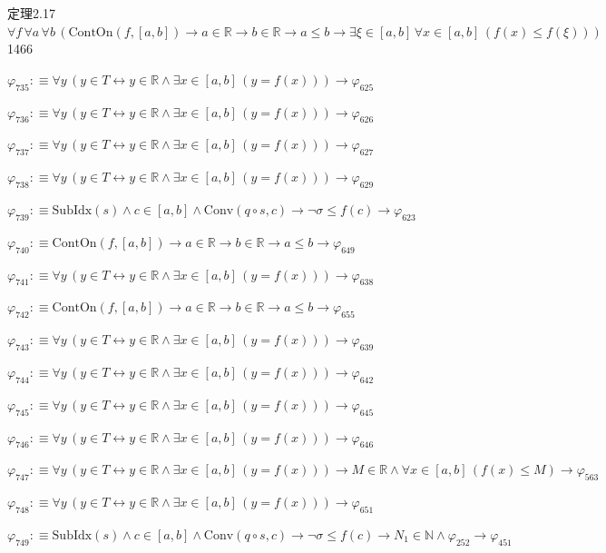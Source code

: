 \begin{fullproof}{定理2.17}{$\forall f\,\forall a\,\forall b\,(\mathrm{ContOn}(f,[a,b]) \to a \in \mathbb{R} \to b \in \mathbb{R} \to a \leq b \to \exists \xi \in [a,b]\,\forall x \in [a,b]\,(f(x) \leq f(\xi)))$}{1466}
\begin{abbrevlist}
\item $\varphi_{735} :\equiv \forall y\,(y \in T \leftrightarrow y \in \mathbb{R} \land \exists x \in [a,b]\,(y = f(x))) \to \varphi_{625}$
\item $\varphi_{736} :\equiv \forall y\,(y \in T \leftrightarrow y \in \mathbb{R} \land \exists x \in [a,b]\,(y = f(x))) \to \varphi_{626}$
\item $\varphi_{737} :\equiv \forall y\,(y \in T \leftrightarrow y \in \mathbb{R} \land \exists x \in [a,b]\,(y = f(x))) \to \varphi_{627}$
\item $\varphi_{738} :\equiv \forall y\,(y \in T \leftrightarrow y \in \mathbb{R} \land \exists x \in [a,b]\,(y = f(x))) \to \varphi_{629}$
\item $\varphi_{739} :\equiv \mathrm{SubIdx}(s) \land c \in [a,b] \land \mathrm{Conv}(q \circ s,c) \to \neg \sigma \leq f(c) \to \varphi_{623}$
\item $\varphi_{740} :\equiv \mathrm{ContOn}(f,[a,b]) \to a \in \mathbb{R} \to b \in \mathbb{R} \to a \leq b \to \varphi_{649}$
\item $\varphi_{741} :\equiv \forall y\,(y \in T \leftrightarrow y \in \mathbb{R} \land \exists x \in [a,b]\,(y = f(x))) \to \varphi_{638}$
\item $\varphi_{742} :\equiv \mathrm{ContOn}(f,[a,b]) \to a \in \mathbb{R} \to b \in \mathbb{R} \to a \leq b \to \varphi_{655}$
\item $\varphi_{743} :\equiv \forall y\,(y \in T \leftrightarrow y \in \mathbb{R} \land \exists x \in [a,b]\,(y = f(x))) \to \varphi_{639}$
\item $\varphi_{744} :\equiv \forall y\,(y \in T \leftrightarrow y \in \mathbb{R} \land \exists x \in [a,b]\,(y = f(x))) \to \varphi_{642}$
\item $\varphi_{745} :\equiv \forall y\,(y \in T \leftrightarrow y \in \mathbb{R} \land \exists x \in [a,b]\,(y = f(x))) \to \varphi_{645}$
\item $\varphi_{746} :\equiv \forall y\,(y \in T \leftrightarrow y \in \mathbb{R} \land \exists x \in [a,b]\,(y = f(x))) \to \varphi_{646}$
\item $\varphi_{747} :\equiv \forall y\,(y \in T \leftrightarrow y \in \mathbb{R} \land \exists x \in [a,b]\,(y = f(x))) \to M \in \mathbb{R} \land \forall x \in [a,b]\,(f(x) \leq M) \to \varphi_{563}$
\item $\varphi_{748} :\equiv \forall y\,(y \in T \leftrightarrow y \in \mathbb{R} \land \exists x \in [a,b]\,(y = f(x))) \to \varphi_{651}$
\item $\varphi_{749} :\equiv \mathrm{SubIdx}(s) \land c \in [a,b] \land \mathrm{Conv}(q \circ s,c) \to \neg \sigma \leq f(c) \to N_{1} \in \mathbb{N} \land \varphi_{252} \to \varphi_{451}$

\end{abbrevlist}
\end{fullproof}
